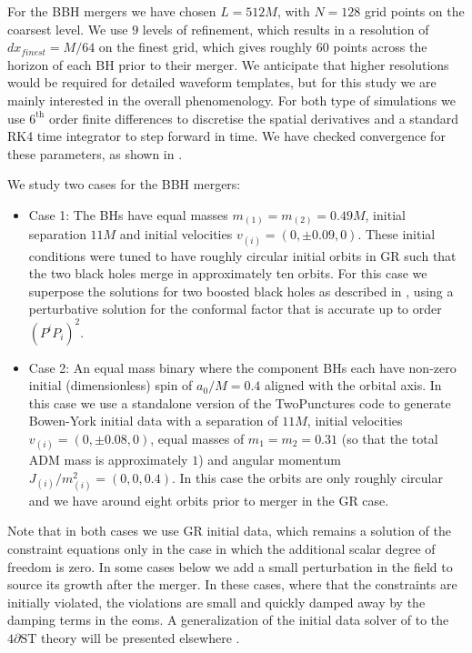 \documentclass[reprint,aps,amsmath,amssymb,twoside,prd,showkeys,superscriptaddress,nofootinbib]{revtex4-2}
\begin{document}
For the BBH mergers we have chosen $L=512M$, with $N=128$ grid points on the coarsest level. We use $9$ levels of refinement, which results in a resolution of $dx_{finest} = M/64$ on the finest grid, which gives roughly 60 points across the horizon of each BH prior to their merger. We anticipate that higher resolutions would be required for detailed waveform templates, but for this study we are mainly interested in the overall phenomenology. For both type of simulations we use $6^\text{th}$ order finite differences to discretise the spatial derivatives and a standard RK4 time integrator to step forward in time.  We have checked convergence for these parameters, as shown in \cite{AresteSalo:2022hua}.

We study two cases for the BBH mergers:
\begin{itemize}
    \item Case 1: The BHs have equal masses $m_{(1)} = m_{(2)} = 0.49M$, initial separation $11M$ and initial velocities $v_{(i)} = (0, \pm0.09, 0)$. These initial conditions were tuned to have roughly circular initial orbits in GR such that the two black holes merge in approximately ten orbits. For this case we superpose the solutions for two boosted black holes as described in \cite{Baumgarte:2010ndz,Bowen:1980yu}, using a perturbative solution for the conformal factor that is accurate up to order $(P^i P_i)^2$.
    \item Case 2: An equal mass binary where the component BHs each have non-zero initial (dimensionless) spin of $a_0/M=0.4$ aligned with the orbital axis. In this case we use a standalone version of the TwoPunctures code \cite{Ansorg:2004ds} to generate Bowen-York initial data \cite{Bowen:1980yu} with a separation of $11M$, initial velocities $v_{(i)}=(0,\pm 0.08, 0)$, equal masses of $m_1=m_2=0.31$ (so that the total ADM mass is approximately $1$) and angular momentum $J_{(i)}/m_{(i)}^2=(0,0,0.4)$. In this case the orbits are only roughly circular and we have around eight orbits prior to merger in the GR case.%
\end{itemize}

Note that in both cases we use GR initial data, which remains a solution of the constraint equations only in the case in which the additional scalar degree of freedom is zero. In some cases below we add a small perturbation in the field to source its growth after the merger. In these cases, where that the constraints are initially violated, the violations are small and quickly damped away by the damping terms in the eoms. A generalization of the initial data solver of \cite{Aurrekoetxea:2022mpw} to the $4\partial\text{ST}$ theory will be presented elsewhere \cite{Brady:2023dgu}.
\end{document}

